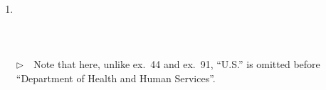\documentclass{article}
\makeatletter
\newif\ifbackrefloaded
\newcommand{\bibreftext}[2]{#2}
\newcommand{\Dutchvon}[2]{#2}
\newcommand{\bibeditortype}[1]{\relax}%
\def\renewbibeditortype{%
  \def\oldBED{}%
  \def\oldBEDS{}%
  \def\bibeditortype##1{%
    \global\let\oldBED\BED
    \global\let\oldBEDS\BEDS
    \global\def\BED{##1\global\let\BED\oldBED  \global\let\BEDS\oldBEDS}%
    \global\def\BEDS{##1\global\let\BED\oldBED \global\let\BEDS\oldBEDS}%
  }%
}
\def\swallownext#1{\relax}
\def\swallowdot{%
    \@ifnextchar.%
      {\swallownext}%
      {\relax}%
}
\def\bibskipbracenodot{\noexpand\bibskipbracenodot}
\newcommand{\EM}{\ensuremath{\triangleright\quad}}
\newcommand{\fieldname}[1]{\texttt{#1}}%
\makeatother
\begin{document}
\begin{enumerate}
      \EM To get the version number correctly formatted, I added the
      information and the correct formatting to the title field:
      \verb+{\upshape(\uppercase{V}ersion~4)}+. A version is a kind
      of edition, but it is more difficult to obtain the correct
      formatting if the \fieldname{edition} field would be used,
      because ``Version'' comes before the number and ``ed.'' after.
\item \cite{ex95} \\ \cite{ex95}\\ \\ \\
      \EM Note that here, unlike ex.~44 and ex.~91,
      ``U.S.'' is omitted before ``Department of Health and Human
      Services''.
\end{enumerate}

%
\renewcommand{\bibreftext}[2]{#1}%
\renewcommand{\Dutchvon}[2]{#1}%
\renewbibeditortype
\def\bibskipbracenodot{\aftergroup\swallowdot}
%
\makeatletter
\if@APAC@index
\else
\fi
\makeatother
%
\ifbackrefloaded
  \catcode`\#=12\relax
\fi
%

%
\ifbackrefloaded
  \catcode`\#=6\relax
\fi
%
\renewcommand{\bibeditortype}[1]{}%
%
\printindex[autx]
\end{document}
